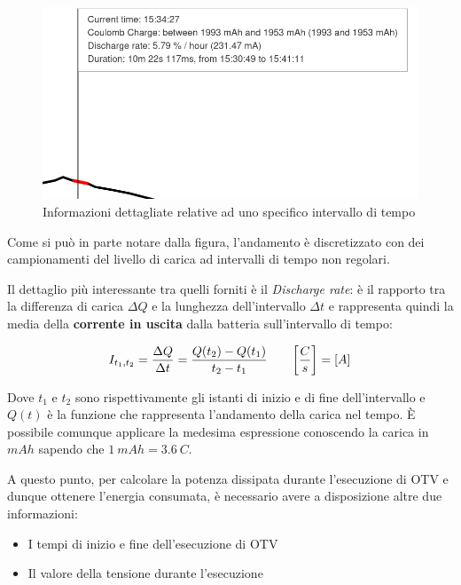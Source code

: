 \begin{figure}[h!]
    \begin{center}
        \includegraphics[scale=0.5]{img/battery_historian_hover.png}
        \caption{Informazioni dettagliate relative ad uno specifico intervallo di tempo}
    \end{center}
\end{figure}

Come si può in parte notare dalla figura, l'andamento è discretizzato con dei campionamenti del livello di carica ad 
intervalli di tempo non regolari.

Il dettaglio più interessante tra quelli forniti è il \textit{Discharge rate}: è il rapporto tra la differenza di carica 
$\Delta Q$ e la lunghezza dell'intervallo $\Delta t$ e rappresenta quindi la media della \textbf{corrente in uscita} dalla 
batteria sull'intervallo di tempo:

\begin{equation*}
    I_{t_1,t_2} = \frac{\Delta Q}{\Delta t} = \frac{Q(t_2) - Q(t_1)}{t_2 - t_1}
    \hspace{7mm}
    \bigg[ \frac{C}{s} \bigg] = [A]
\end{equation*}

Dove $t_1$ e $t_2$ sono rispettivamente gli istanti di inizio e di fine dell'intervallo e $Q(t)$ è la funzione 
che rappresenta l'andamento della carica nel tempo. È possibile comunque applicare la medesima espressione conoscendo la 
carica in $mAh$ sapendo che $1~mAh = 3.6~C$.

A questo punto, per calcolare la potenza dissipata durante l'esecuzione di OTV e dunque ottenere l'energia consumata, è
necessario avere a disposizione altre due informazioni:
\begin{itemize}
    \item I tempi di inizio e fine dell'esecuzione di OTV
    \item Il valore della tensione durante l'esecuzione
\end{itemize}

